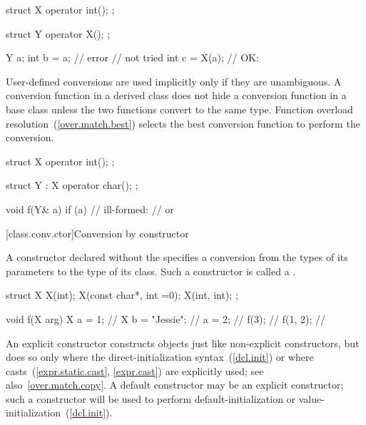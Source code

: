 \enterexample

\begin{codeblock}
struct X {
  operator int();
};

struct Y {
  operator X();
};

Y a;
int b = a;          // error
                    //  not tried
int c = X(a);       // OK: 
\end{codeblock}
\exitexample

\pnum
User-defined conversions are used implicitly only if they are unambiguous.
%
A conversion function in a derived class does not hide a conversion function
in a base class unless the two functions convert to the same type.
Function overload resolution~(\ref{over.match.best}) selects the best
conversion function to perform the conversion.
\enterexample

\begin{codeblock}
struct X {
  operator int();
};

struct Y : X {
    operator char();
};

void f(Y& a) {
  if (a) {          // ill-formed:
                    //  or 
  }
}
\end{codeblock}
\exitexample

[class.conv.ctor]{Conversion by constructor}%

\pnum
A constructor declared without the
specifies a conversion from
the types of its parameters
to the type of its class.
Such a constructor is called a
%
.
\enterexample

%
\begin{codeblock}
struct X {
    X(int);
    X(const char*, int =0);
    X(int, int);
};

void f(X arg) {
  X a = 1;          // 
  X b = "Jessie";   // 
  a = 2;            // 
  f(3);             // 
  f({1, 2});        // 
}
\end{codeblock}
\exitexample

\pnum
\enternote
An explicit constructor constructs objects just like non-explicit
constructors, but does so only where the direct-initialization syntax~(\ref{dcl.init}) or where casts~(\ref{expr.static.cast}, \ref{expr.cast}) are explicitly
used; see also~\ref{over.match.copy}.
A default constructor may be an explicit constructor; such a constructor
will be used to perform default-initialization
or value-initialization~(\ref{dcl.init}).
\enterexample

